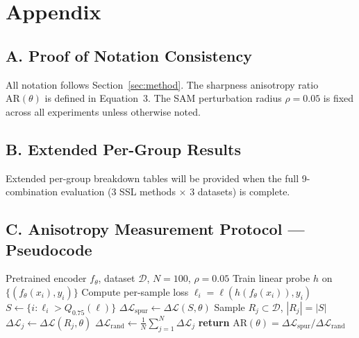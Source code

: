 \section*{Appendix}
\label{sec:appendix}

\subsection*{A. Proof of Notation Consistency}

All notation follows Section~\ref{sec:method}. The sharpness anisotropy ratio $\text{AR}(\theta)$ is defined in Equation~3. The SAM perturbation radius $\rho = 0.05$ is fixed across all experiments unless otherwise noted.

\subsection*{B. Extended Per-Group Results}

Extended per-group breakdown tables will be provided when the full 9-combination evaluation (3 SSL methods $\times$ 3 datasets) is complete.

\subsection*{C. Anisotropy Measurement Protocol --- Pseudocode}

\begin{algorithm}
\caption{Sharpness Anisotropy Ratio Measurement}
\label{alg:anisotropy}
\begin{algorithmic}[1]
\REQUIRE Pretrained encoder $f_\theta$, dataset $\mathcal{D}$, $N=100$, $\rho=0.05$
\STATE Train linear probe $h$ on $\{(f_\theta(x_i), y_i)\}$
\STATE Compute per-sample loss $\ell_i = \ell(h(f_\theta(x_i)), y_i)$
\STATE $S \leftarrow \{i : \ell_i > Q_{0.75}(\ell)\}$ 
\STATE $\Delta\mathcal{L}_{\text{spur}} \leftarrow \Delta\mathcal{L}(S, \theta)$ 
    \STATE Sample $R_j \subset \mathcal{D}$, $|R_j| = |S|$
    \STATE $\Delta\mathcal{L}_j \leftarrow \Delta\mathcal{L}(R_j, \theta)$
\ENDFOR
\STATE $\Delta\mathcal{L}_{\text{rand}} \leftarrow \frac{1}{N}\sum_{j=1}^N \Delta\mathcal{L}_j$
\STATE \textbf{return} $\text{AR}(\theta) = \Delta\mathcal{L}_{\text{spur}} / \Delta\mathcal{L}_{\text{rand}}$
\end{algorithmic}
\end{algorithm}

